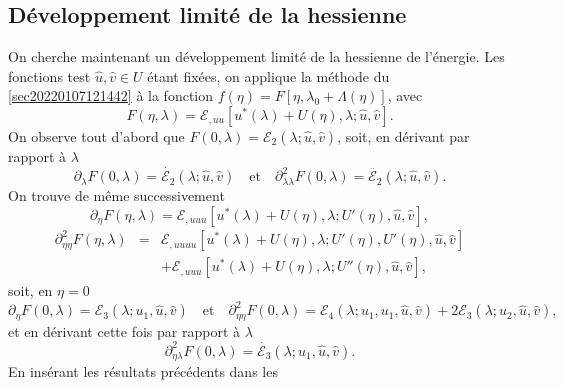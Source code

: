 \documentclass[12pt, final]{amsart}
\begin{document}
\subsection{Développement limité de la
hessienne}\label{sec20211115081016}

On cherche maintenant un développement limité de la hessienne de
l'énergie. Les fonctions test $\hat{u}, \hat{v} \in U$ étant
fixées, on applique la méthode du
{\textsection}\ref{sec20220107121442} à la fonction $f (\eta) = F [\eta,
\lambda_0 + \Lambda (\eta)]$, avec
\begin{equation}
  F (\eta, \lambda) =\mathcal{E}_{, u  u} [u^{\ast} (\lambda) + U
  (\eta), \lambda ; \hat{u}, \hat{v}] .
\end{equation}
On observe tout d'abord que $F (0, \lambda) =\mathcal{E}_2 (\lambda ; \hat{u},
\hat{v})$, soit, en dérivant par rapport à $\lambda$
\begin{equation}
  \partial_{\lambda} F (0, \lambda) = \dot{\mathcal{E}_2} (\lambda ; \hat{u},
  \hat{v}) \quad \text{et} \quad \partial_{\lambda  \lambda}^2 F (0,
  \lambda) = \ddot{\mathcal{E}_2} (\lambda ; \hat{u}, \hat{v}) .
\end{equation}
On trouve de m{\^e}me successivement
\begin{equation}
  \partial_{\eta} F (\eta, \lambda) =\mathcal{E}_{, u  u  u}
  [u^{\ast} (\lambda) + U (\eta), \lambda ; U' (\eta), \hat{u}, \hat{v}],
\end{equation}
\begin{eqnarray}
  \partial_{\eta  \eta}^2 F (\eta, \lambda) & = & \mathcal{E}_{, u
   u  u  u} [u^{\ast} (\lambda) + U (\eta), \lambda ;
  U' (\eta), U' (\eta), \hat{u}, \hat{v}] \nonumber\\
  &  & +\mathcal{E}_{, u  u  u} [u^{\ast} (\lambda) + U
  (\eta), \lambda ; U'' (\eta), \hat{u}, \hat{v}],
\end{eqnarray}
soit, en $\eta = 0$
\begin{equation}
  \partial_{\eta} F (0, \lambda) =\mathcal{E}_3 (\lambda ; u_1, \hat{u},
  \hat{v}) \quad \text{et} \quad \partial_{\eta  \eta}^2 F (0,
  \lambda) =\mathcal{E}_4 (\lambda ; u_1, u_1, \hat{u}, \hat{v}) +
  2\mathcal{E}_3 (\lambda ; u_2, \hat{u}, \hat{v}),
\end{equation}
et en dérivant cette fois par rapport à $\lambda$
\begin{equation}
  \partial_{\eta  \lambda}^2 F (0, \lambda) = \dot{\mathcal{E}_3}
  (\lambda ; u_1, \hat{u}, \hat{v}) .
\end{equation}
En insérant les résultats précédents dans les
\end{document}
